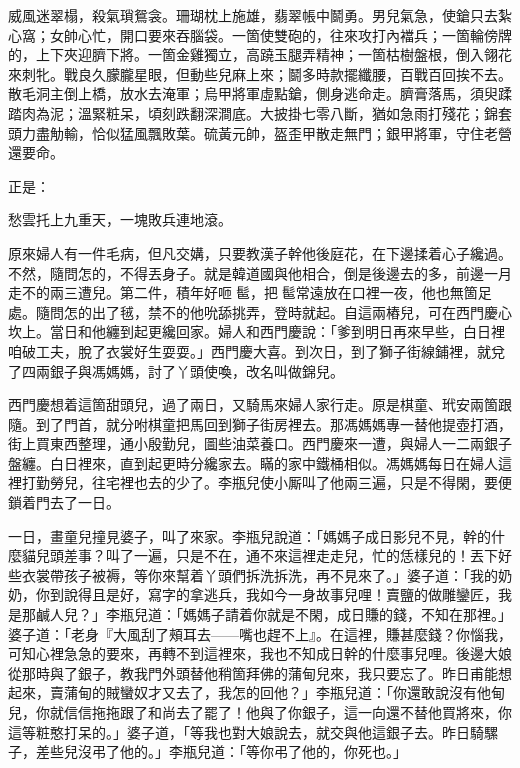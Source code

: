 \begin{myquote}
威風迷翠榻，殺氣瑣鴛衾。珊瑚枕上施雄，翡翠帳中鬬勇。男兒氣急，使鎗只去紮心窩；女帥心忙，開口要來吞腦袋。一箇使雙砲的，往來攻打內襠兵；一箇輪傍牌的，上下夾迎臍下將。一箇金雞獨立，高蹺玉腿弄精神；一箇枯樹盤根，倒入翎花來刺牝。戰良久朦朧星眼，但動些兒麻上來；鬬多時款擺纖腰，百戰百回挨不去。散毛洞主倒上橋，放水去淹軍；烏甲將軍虛點鎗，側身逃命走。臍膏落馬，須臾蹂踏肉為泥；溫緊粧呆，頃刻跌翻深澗底。大披掛七零八斷，猶如急雨打殘花；錦套頭力盡觔輸，恰似猛風飄敗葉。硫黃元帥，盔歪甲散走無門；銀甲將軍，守住老營還要命。
\end{myquote}

正是：

\begin{myquote}
愁雲托上九重天，一塊敗兵連地滾。
\end{myquote}

原來婦人有一件毛病，{}但凡交媾，只要教漢子幹他後庭花，在下邊揉着心子纔過。不然，隨問怎的，不得丟身子。就是韓道國與他相合，倒是後邊去的多，前邊一月走不的兩三遭兒。第二件，積年好咂𩫻䯲，把𩫻䯲常遠放在口裡一夜，他也無箇足處。隨問怎的出了毧，禁不的他吮舔挑弄，登時就起。自這兩樁兒，可在西門慶心坎上。當日和他纏到起更纔回家。婦人和西門慶說：「爹到明日再來早些，白日裡咱破工夫，脫了衣裳好生耍耍。」西門慶大喜。到次日，到了獅子街線鋪裡，就兌了四兩銀子與馮媽媽，討了丫頭使喚，改名叫做錦兒。

西門慶想着這箇甜頭兒，過了兩日，又騎馬來婦人家行走。原是棋童、玳安兩箇跟隨。到了門首，就分咐棋童把馬回到獅子街房裡去。那馮媽媽專一替他提壺打酒，街上買東西整理，通小殷勤兒，圖些油菜養口。西門慶來一遭，與婦人一二兩銀子盤纏。白日裡來，直到起更時分纔家去。瞞的家中鐵桶相似。馮媽媽每日在婦人這裡打勤勞兒，往宅裡也去的少了。李瓶兒使小厮叫了他兩三遍，只是不得閑，要便鎖着門去了一日。

一日，畫童兒撞見婆子，叫了來家。李瓶兒說道：「媽媽子成日影兒不見，幹的什麼貓兒頭差事？叫了一遍，只是不在，通不來這裡走走兒，忙的恁樣兒的！丟下好些衣裳帶孩子被褥，等你來幫着丫頭們拆洗拆洗，再不見來了。」婆子道：「我的奶奶，你到說得且是好，寫字的拿逃兵，我如今一身故事兒哩！賣鹽的做雕鑾匠，我是那鹹人兒？」{}李瓶兒道：「媽媽子請着你就是不閑，成日賺的錢，不知在那裡。」婆子道：「老身『大風刮了頰耳去——嘴也趕不上』。在這裡，賺甚麼錢？你惱我，可知心裡急急的要來，再轉不到這裡來，我也不知成日幹的什麼事兒哩。後邊大娘從那時與了銀子，教我門外頭替他稍箇拜佛的蒲甸兒來，我只要忘了。昨日甫能想起來，賣蒲甸的賊蠻奴才又去了，我怎的回他？」李瓶兒道：「你還敢說沒有他甸兒，你就信信拖拖跟了和尚去了罷了！他與了你銀子，這一向還不替他買將來，你這等粧憨打呆的。」婆子道，「等我也對大娘說去，就交與他這銀子去。昨日騎騾子，差些兒沒弔了他的。」李瓶兒道：「等你弔了他的，你死也。」

